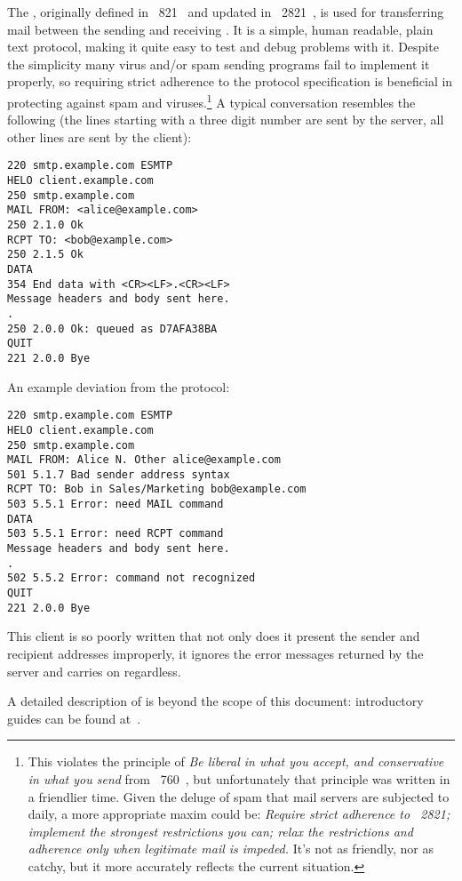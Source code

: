 \documentclass[a4paper,12pt,draft]{article}
\begin{document}
The \SMTPlong{}, originally defined in \RFC{}~821~\cite{RFC821} and updated
in \RFC{}~2821~\cite{RFC2821}, is used for transferring mail between the
sending and receiving \MTA{}\@.  It is a simple, human readable, plain text
protocol, making it quite easy to test and debug problems with it.  Despite
the simplicity many virus and/or spam sending programs fail to implement it
properly, so requiring strict adherence to the protocol specification is
beneficial in protecting against spam and viruses.\footnote{This violates
the principle of \textit{Be liberal in what you accept, and conservative in
what you send\/} from \RFC{}~760~\cite{rfc760}, but unfortunately that
principle was written in a friendlier time.  Given the deluge of spam that
mail servers are subjected to daily, a more appropriate maxim could be:
\textit{Require strict adherence to \RFC{}~2821; implement the strongest
restrictions you can; relax the restrictions and adherence only when
legitimate mail is impeded.\/}  It's not as friendly, nor as catchy, but it
more accurately reflects the current situation.} A typical \SMTP{}
conversation resembles the following (the lines starting with a three digit
number are sent by the server, all other lines are sent by the client):

\begin{verbatim}
220 smtp.example.com ESMTP
HELO client.example.com
250 smtp.example.com
MAIL FROM: <alice@example.com>
250 2.1.0 Ok
RCPT TO: <bob@example.com>
250 2.1.5 Ok
DATA
354 End data with <CR><LF>.<CR><LF>
Message headers and body sent here.
.
250 2.0.0 Ok: queued as D7AFA38BA
QUIT
221 2.0.0 Bye
\end{verbatim}

An example deviation from the protocol:

\begin{verbatim}
220 smtp.example.com ESMTP
HELO client.example.com
250 smtp.example.com
MAIL FROM: Alice N. Other alice@example.com
501 5.1.7 Bad sender address syntax
RCPT TO: Bob in Sales/Marketing bob@example.com
503 5.5.1 Error: need MAIL command
DATA
503 5.5.1 Error: need RCPT command
Message headers and body sent here.
.
502 5.5.2 Error: command not recognized
QUIT
221 2.0.0 Bye
\end{verbatim}

This client is so poorly written that not only does it present the sender
and recipient addresses improperly, it ignores the error messages returned
by the server and carries on regardless.

A detailed description of \SMTP{} is beyond the scope of this document:
introductory guides can be found at~\cite{smtp-intro-01, smtp-intro-02}.
\end{document}
